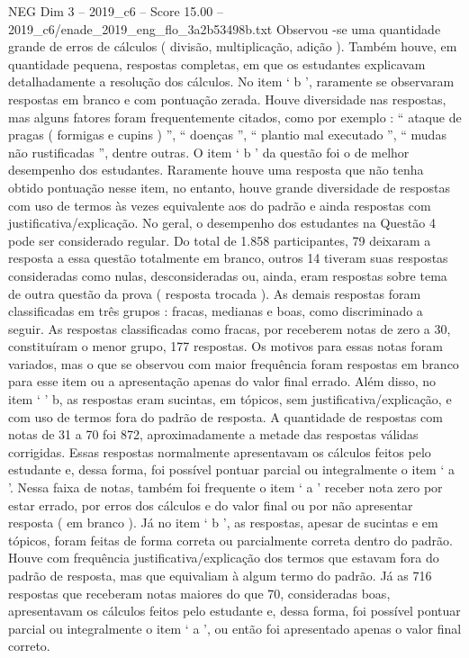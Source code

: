 \begin{textsample}{NEG Dim 3 – 2019\_c6 – Score 15.00 – 2019\_c6/enade\_2019\_eng\_flo\_3a2b53498b.txt}
Observou -se uma quantidade grande de erros de cálculos ( divisão, multiplicação, adição ).
Também houve, em quantidade pequena, respostas completas, em que os estudantes explicavam detalhadamente a resolução dos cálculos.
No item ‘ b ’, raramente se observaram respostas em branco e com pontuação zerada.
Houve diversidade nas respostas, mas alguns fatores foram frequentemente citados, como por exemplo : “ ataque de pragas ( formigas e cupins ) ”, “ doenças ”, “ plantio mal executado ”, “ mudas não rustificadas ”, dentre outras.
O item ‘ b ’ da questão foi o de melhor desempenho dos estudantes.
Raramente houve uma resposta que não tenha obtido pontuação nesse item, no entanto, houve grande diversidade de respostas com uso de termos às vezes equivalente aos do padrão e ainda respostas com justificativa/explicação.
No geral, o desempenho dos estudantes na Questão 4 pode ser considerado regular.
Do total de 1.858 participantes, 79 deixaram a resposta a essa questão totalmente em branco, outros 14 tiveram suas respostas consideradas como nulas, desconsideradas ou, ainda, eram respostas sobre tema de outra questão da prova ( resposta trocada ).
As demais respostas foram classificadas em três grupos : fracas, medianas e boas, como discriminado a seguir.
As respostas classificadas como fracas, por receberem notas de zero a 30, constituíram o menor grupo, 177 respostas.
Os motivos para essas notas foram variados, mas o que se observou com maior frequência foram respostas em branco para esse item ou a apresentação apenas do valor final errado.
Além disso, no item ‘ ’ b, as respostas eram sucintas, em tópicos, sem justificativa/explicação, e com uso de termos fora do padrão de resposta.
A quantidade de respostas com notas de 31 a 70 foi 872, aproximadamente a metade das respostas válidas corrigidas.
Essas respostas normalmente apresentavam os cálculos feitos pelo estudante e, dessa forma, foi possível pontuar parcial ou integralmente o item ‘ a ’.
Nessa faixa de notas, também foi frequente o item ‘ a ’ receber nota zero por estar errado, por erros dos cálculos e do valor final ou por não apresentar resposta ( em branco ).
Já no item ‘ b ’, as respostas, apesar de sucintas e em tópicos, foram feitas de forma correta ou parcialmente correta dentro do padrão.
Houve com frequência justificativa/explicação dos termos que estavam fora do padrão de resposta, mas que equivaliam à algum termo do padrão.
Já as 716 respostas que receberam notas maiores do que 70, consideradas boas, apresentavam os cálculos feitos pelo estudante e, dessa forma, foi possível pontuar parcial ou integralmente o item ‘ a ’, ou então foi apresentado apenas o valor final correto.

\end{textsample}
